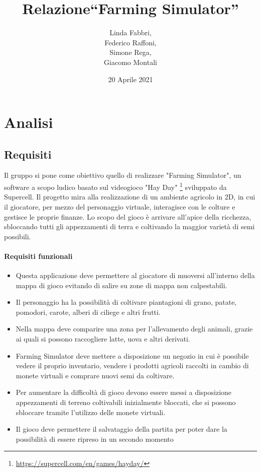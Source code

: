 \documentclass[a4paper,12pt]{report}
\title{Relazione\break``Farming Simulator''}
\author{Linda Fabbri, \\ Federico Raffoni,\\ Simone Rega,\\ Giacomo Montali}
\date{20 Aprile 2021}
\begin{document}
\maketitle

\tableofcontents

\chapter{Analisi}


\section{Requisiti}


Il gruppo si pone come obiettivo quello di realizzare "Farming Simulator", un software a scopo ludico basato sul videogioco "Hay Day" \footnote{\url{https://supercell.com/en/games/hayday/}} sviluppato da Supercell.
%
Il progetto mira alla realizzazione di un ambiente agricolo in 2D, in cui il giocatore, per mezzo del personaggio virtuale, interagisce con le colture e gestisce le proprie finanze.
%
Lo scopo del gioco è arrivare all'apice della ricchezza, sbloccando tutti gli appezzamenti di terra e coltivando la maggior varietà di semi possibili.


\subsubsection{Requisiti funzionali}
\begin{itemize}
	\item Questa applicazione deve permettere al giocatore di muoversi all'interno della mappa di gioco evitando di salire su zone di mappa non calpestabili.
	\item Il personaggio ha la possibilità di coltivare piantagioni di grano, patate, pomodori, carote, alberi di ciliege e altri frutti.
	\item Nella mappa deve comparire una zona per l'allevamento degli animali, grazie ai quali si possono raccogliere latte, uova e altri derivati.
	\item Farming Simulator deve mettere a disposizione un negozio in cui è possibile vedere il proprio inventario, vendere i prodotti agricoli raccolti in cambio di monete virtuali e comprare nuovi semi da coltivare.
	\item Per aumentare la difficoltà di gioco devono essere messi a disposizione appezzamenti di terreno coltivabili inizialmente bloccati, che si possono sbloccare tramite l'utilizzo delle monete virtuali.
	\item Il gioco deve permettere il salvataggio della partita per poter dare la possibilità di essere ripreso in un secondo momento
\end{itemize}
\end{document}
